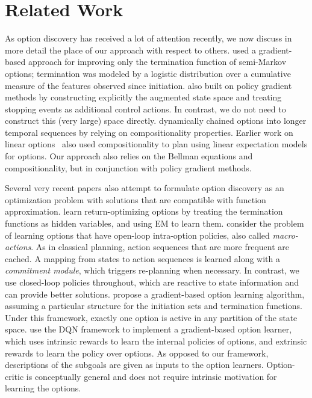 \documentclass[letterpaper]{article}
\begin{document}
 \section{Related Work}
As option discovery has received a lot of attention recently, we now discuss in
more detail the place of our approach with respect to others.
\cite{Comanici2010} used a gradient-based approach for improving only the termination
function of semi-Markov options; termination was modeled by a logistic
distribution over a cumulative measure of the features observed since initiation.
\cite{levy2011} also built on policy gradient methods by constructing explicitly the augmented
state space and treating stopping events as additional control actions.
In contrast, we do not need to construct this (very large) space directly.
\cite{Silver2012} dynamically chained options into longer temporal sequences by
relying on compositionality properties. Earlier work on linear
options~\cite{Sorg2010} also used compositionality to plan using linear
expectation models for options.
Our approach also relies on the Bellman equations and compositionality, but in conjunction with policy gradient methods.

Several very recent papers also attempt to formulate option discovery as an
optimization problem with solutions that are compatible with function approximation.
\cite{Daniel2016} learn return-optimizing options by treating the termination
functions as hidden variables, and using EM to learn them. \cite{Vezhnevets2016}
consider the problem of learning options that have open-loop intra-option policies,
also called \textit{macro-actions}.
As in classical planning, action sequences that are more frequent are cached.
A mapping from states to action sequences
is learned along with a \textit{commitment module}, which triggers
re-planning when necessary. In contrast, we use closed-loop policies throughout,
which are reactive to state information and can provide better solutions.
\cite{Mankowitz2016} propose a gradient-based option learning algorithm,
assuming a particular structure for the initiation sets and termination functions.
Under this framework, exactly one option is active in any partition of the state space.
\cite{Kulkarni2016} use the DQN framework to implement a gradient-based option
learner, which uses intrinsic rewards to learn the internal policies of options,
and extrinsic rewards to learn the policy over options. As opposed to our framework,
descriptions of the subgoals are given as inputs to the option learners.
Option-critic is conceptually general and does not require intrinsic motivation
for learning the options.
\end{document}
